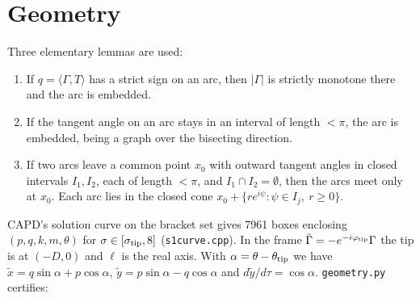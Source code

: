 \documentclass[11pt]{amsart}
\theoremstyle{remark}
\newcommand{\ip}[2]{\langle #1,#2\rangle}
\begin{document}
\section{Geometry}\label{sec:geom}
Three elementary lemmas are used:
\begin{enumerate}
\item[(L1)] If $q=\ip{\Gamma}{T}$ has a strict sign on an arc, then $|\Gamma|$ is strictly monotone there and the arc is embedded.
\item[(L2)] If the tangent angle on an arc stays in an interval of length $<\pi$, the arc is embedded, being a graph over the bisecting direction.
\item[(L3)] If two arcs leave a common point $x_0$ with outward tangent angles in closed intervals $I_1,I_2$, each of length $<\pi$, and $I_1\cap I_2=\emptyset$, then the arcs meet only at $x_0$. Each arc lies in the closed cone $x_0+\{re^{i\psi}:\psi\in I_j,\ r\ge0\}$.
\end{enumerate}
CAPD's solution curve on the bracket set gives 7961 boxes enclosing $(p,q,k,m,\theta)$ for $\sigma\in[\sigma_{\rm tip},8]$ (\texttt{s1curve.cpp}). In the frame $\tilde\Gamma=-e^{-i\varphi_{\rm tip}}\Gamma$ the tip is at $(-D,0)$ and $\ell$ is the real axis. With $\alpha=\theta-\theta_{\rm tip}$ we have $\tilde x=q\sin\alpha+p\cos\alpha$, $\tilde y=p\sin\alpha-q\cos\alpha$ and $d\tilde y/d\tau=\cos\alpha$. \texttt{geometry.py} certifies:
\end{document}
